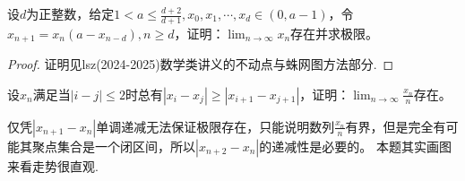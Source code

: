 \documentclass[../../main.tex]{subfiles}
\begin{document}
\begin{example}
设\(d\)为正整数，给定\(1 < a\leqslant \frac{d + 2}{d + 1},x_0,x_1,\cdots,x_d\in(0,a - 1)\)，令\(x_{n + 1}=x_n(a - x_{n - d}),n\geqslant  d\)，证明：\(\lim_{n\rightarrow\infty}x_n\)存在并求极限。
\end{example}
\begin{proof}
证明见lsz(2024-2025)数学类讲义的不动点与蛛网图方法部分.

\end{proof}



\begin{example}
设\(x_n\)满足当\(|i - j|\leqslant 2\)时总有\(|x_i - x_j|\geqslant |x_{i + 1}-x_{j + 1}|\)，证明：\(\lim_{n\rightarrow\infty}\frac{x_n}{n}\)存在。
\end{example}
\begin{remark}
仅凭\(|x_{n + 1}-x_n|\)单调递减无法保证极限存在，只能说明数列\(\frac{x_n}{n}\)有界，但是完全有可能其聚点集合是一个闭区间，所以\(|x_{n + 2}-x_n|\)的递减性是必要的。
本题其实画图来看走势很直观.
\end{remark}
\end{document}
